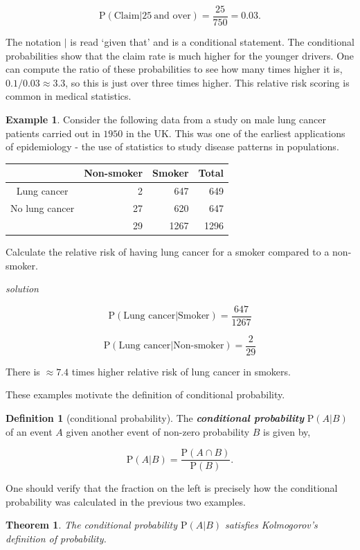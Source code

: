 \documentclass[
]{book}
\newtheorem{theorem}{Theorem}[chapter]
\theoremstyle{definition}
\newtheorem{definition}{Definition}[chapter]
\theoremstyle{definition}
\newtheorem{example}{Example}[chapter]
\theoremstyle{definition}
\theoremstyle{definition}
\theoremstyle{remark}
\begin{document}
\[\text{P}(\text{Claim}| 25 \ \text{and over})=\frac{25}{750} = 0.03.\]

The notation \(|\) is read `given that' and is a conditional statement. The conditional probabilities show that the claim rate is much higher for the younger drivers. One can compute the ratio of these probabilities to see how many times higher it is, \(0.1/0.03 \approx 3.3\), so this is just over three times higher. This relative risk scoring is common in medical statistics.

\begin{example}
\protect\hypertarget{exm:cancer}{}\label{exm:cancer}Consider the following data from a study on male lung cancer patients carried out in \(1950\) in the UK. This was one of the earliest applications of epidemiology - the use of statistics to study disease patterns in populations.

\begin{longtable}[]{@{}crrr@{}}
\toprule
& Non-smoker & Smoker & Total\tabularnewline
\midrule
\endhead
Lung cancer & 2 & 647 & 649\tabularnewline
No lung cancer & 27 & 620 & 647\tabularnewline
& 29 & 1267 & 1296\tabularnewline
\bottomrule
\end{longtable}

Calculate the relative risk of having lung cancer for a smoker compared to a non-smoker.

\emph{solution}

\[\text{P}(\text{Lung cancer}|\text{Smoker}) = \frac{647}{1267}\]

\[\text{P}(\text{Lung cancer}|\text{Non-smoker}) = \frac{2}{29}\]

There is \(\approx 7.4\) times higher relative risk of lung cancer in smokers.
\end{example}

These examples motivate the definition of conditional probability.

\begin{definition}[conditional probability]
The \textbf{\emph{conditional probability}} \(\text{P}(A|B)\) of an event \(A\) given another event of non-zero probability \(B\) is given by,

\[\text{P}(A|B) = \frac{\text{P}(A\cap B)}{\text{P}(B)}.\]
\end{definition}

One should verify that the fraction on the left is precisely how the conditional probability was calculated in the previous two examples.

\begin{theorem}
The conditional probability \(\text{P}(A|B)\) satisfies Kolmogorov's definition of probability.
\end{theorem}
\end{document}
